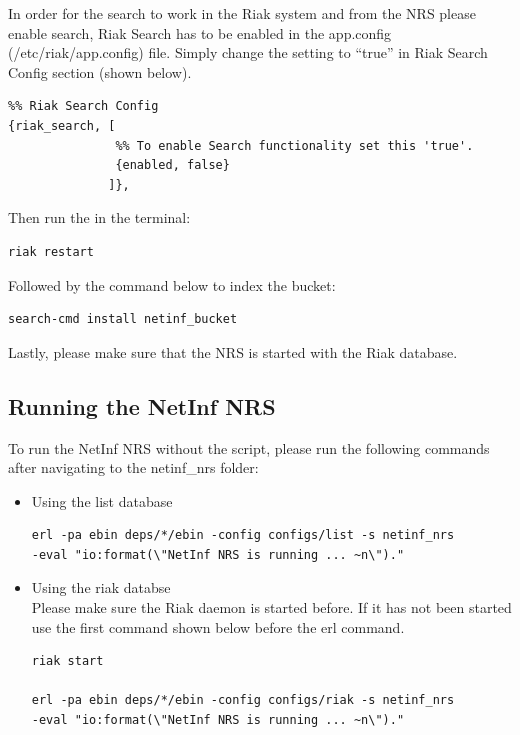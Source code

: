 In order for the search to work in the Riak system and from the NRS please enable search, 
Riak Search has to be enabled in the app.config (/etc/riak/app.config) file. Simply change the setting to “true” in Riak Search Config section (shown below).

\begin{verbatim}
%% Riak Search Config
{riak_search, [
               %% To enable Search functionality set this 'true'.
               {enabled, false}
              ]},
\end{verbatim}

Then run the in the terminal:

\begin{verbatim}
riak restart
\end{verbatim}

Followed by the command below to index the bucket:

\begin{verbatim}
search-cmd install netinf_bucket
\end{verbatim}

Lastly, please make sure that the NRS is started with the Riak database.

\subsection{Running the NetInf NRS}

To run the NetInf NRS without the script, please run the following commands after navigating to the netinf\_nrs folder:

\begin{itemize}
\item Using the list database \\
\begin{verbatim}
erl -pa ebin deps/*/ebin -config configs/list -s netinf_nrs 
-eval "io:format(\"NetInf NRS is running ... ~n\")." 
\end{verbatim}

\item Using the riak databse \\
Please make sure the Riak daemon is started before. If it has not been started use the first command shown below before the erl command.
\begin{verbatim}
riak start

erl -pa ebin deps/*/ebin -config configs/riak -s netinf_nrs 
-eval "io:format(\"NetInf NRS is running ... ~n\")." 
\end{verbatim}
\end{itemize}